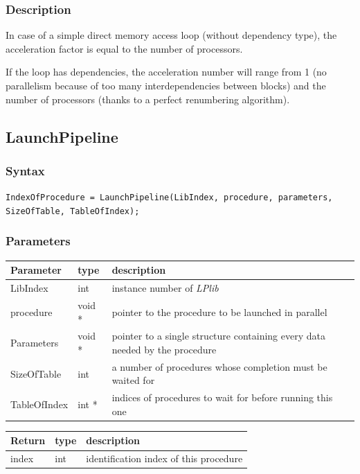 \documentclass[a4paper,12pt]{article}
\begin{document}
\subsubsection*{Description}
In case of a simple direct memory access loop (without dependency type), the acceleration factor is equal to the number of processors.

If the loop has dependencies, the acceleration number will range from 1 (no parallelism because of too many interdependencies between blocks) and the number of processors (thanks to a perfect renumbering algorithm).


\subsection{LaunchPipeline}

\subsubsection*{Syntax}
\tt{IndexOfProcedure = LaunchPipeline(LibIndex, procedure, parameters, SizeOfTable, TableOfIndex);}
\normalfont

\subsubsection*{Parameters}
\begin{tabular}{|m{3cm}|m{1.5cm}|m{10.5cm}|}
\hline
Parameter    & type   & description \\
\hline
LibIndex     & int    & instance number of \emph{LPlib} \\
\hline
procedure    & void * & pointer to the procedure to be launched in parallel \\
\hline
Parameters   & void * & pointer to a single structure containing every data needed by the procedure \\
\hline
SizeOfTable  & int    & a number of procedures whose completion must be waited for \\
\hline
TableOfIndex & int *  & indices of procedures to wait for before running this one \\
\hline
\end{tabular}

\medskip

\noindent
\begin{tabular}{|m{3cm}|m{1.5cm}|m{10.5cm}|}
\hline
Return       & type   & description \\
\hline
index        & int    & identification index of this procedure \\
\hline
\end{tabular}
\end{document}
